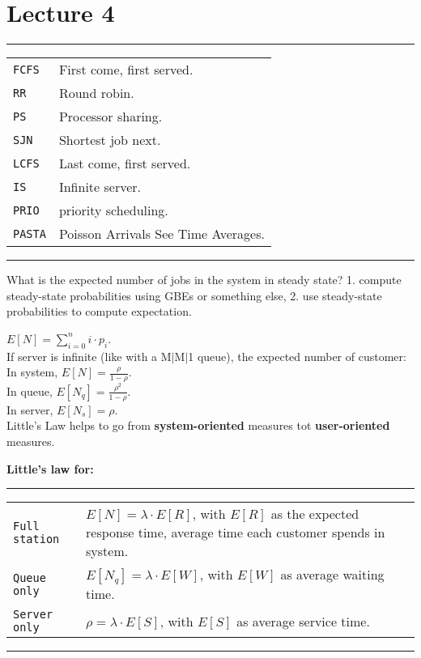 \section{Lecture 4}
\hrule
{}
\begin{tabular}{@{}p{\the\MyLen}@{}p{\linewidth-\the\MyLen}@{}}
\verb!FCFS!				&	First come, first served.\\
\verb!RR!				&	Round robin.\\
\verb!PS!				&	Processor sharing.\\
\verb!SJN!				&	Shortest job next.\\
\verb!LCFS!				&	Last come, first served.\\
\verb!IS!				&	Infinite server.\\
\verb!PRIO!				&	priority scheduling.\\
\verb!PASTA!			&	Poisson Arrivals See Time Averages.\\
\end{tabular}
\hrule

What is the expected number of jobs in the system in steady
state? 1. compute steady-state probabilities using GBEs or something else, 2. use steady-state probabilities to compute expectation. 

$E[N] = \sum^{n}_{i=0} i \cdot p_{i}$.\\
If server is infinite (like with a M$|$M$|$1 queue), the expected number of customer:\\
In system, $E[N] = \frac{\rho}{1-\rho}$.\\
In queue, $E[N_{q}] = \frac{\rho^2}{1-\rho}$.\\
In server, $E[N_{s}] = \rho$.\\

Little's Law helps to go from \textbf{system-oriented} measures tot \textbf{user-oriented} measures. 

\textbf{Little's law for:}
\hrule
{}
\begin{tabular}{@{}p{\the\MyLen}@{}p{\linewidth-\the\MyLen}@{}}
\verb!Full station!				&	$E[N] = \lambda \cdot E[R]$, with $E[R]$ as the expected response time, average time each customer spends in system.\\
\verb!Queue only!				&	$E[N_{q}] = \lambda \cdot E[W]$, with $E[W]$ as average waiting time.\\
\verb!Server only!				&	$\rho = \lambda \cdot E[S]$, with $E[S]$ as  average service time.\\
\end{tabular}
\hrule

